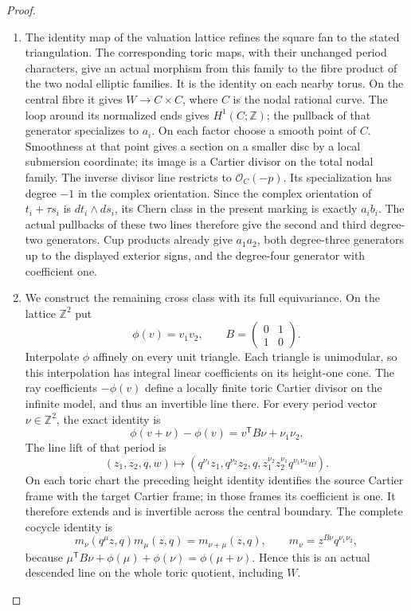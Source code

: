 \begin{proof}
\begin{enumerate}[label=\arabic*.]
\item The identity map of the valuation lattice refines the square
fan to the stated triangulation.  The corresponding toric maps,
with their unchanged period characters, give an actual morphism
from this family to the fibre product of the two nodal elliptic
families.  It is the identity on each nearby torus.  On the central
fibre it gives \(W\to C\times C\), where
\(C\) is the nodal rational curve.  The loop around its normalized
ends gives \(H^1(C;\mathbb Z)\); the pullback of that generator
specializes to \(a_i\).  On each factor choose a smooth point of
\(C\).  Smoothness at that point gives a section on a smaller
disc by a local submersion coordinate; its image is a Cartier
divisor on the total nodal family.  The inverse divisor line
restricts to \(\mathcal O_C(-p)\).  Its specialization has
degree \(-1\) in the complex orientation.  Since the complex
orientation of \(t_i+\tau s_i\) is \(dt_i\wedge ds_i\), its
Chern class in the present marking is exactly \(a_ib_i\).
The actual pullbacks of these two lines therefore give the second
and third degree-two generators.  Cup products already give
\(a_1a_2\), both degree-three generators up to the displayed
exterior signs, and the degree-four generator with coefficient one.

\item We construct the remaining cross class with its full
equivariance.  On the lattice \(\mathbb Z^2\) put
\[
       \phi(v)=v_1v_2,\qquad
       B=\begin{pmatrix}0&1\\1&0\end{pmatrix}.
\]
Interpolate \(\phi\) affinely on every unit triangle.  Each
triangle is unimodular, so this interpolation has integral
linear coefficients on its height-one cone.  The ray coefficients
\(-\phi(v)\) define a locally finite toric Cartier divisor on
the infinite model, and thus an invertible line there.  For every
period vector \(\nu\in\mathbb Z^2\), the exact identity is
\[
 \phi(v+\nu)-\phi(v)=v^{\mathsf T}B\nu+\nu_1\nu_2.
\]
The line lift of that period is
\[
 (z_1,z_2,q,w)\longmapsto
 (q^{\nu_1}z_1,q^{\nu_2}z_2,q,
      z_1^{\nu_2}z_2^{\nu_1}q^{\nu_1\nu_2}w).
\]
On each toric chart the preceding height identity identifies the
source Cartier frame with the target Cartier frame; in those
frames its coefficient is one.  It therefore extends and is
invertible across the central boundary.  The complete cocycle
identity is
\[
 m_\nu(q^\mu z,q)m_\mu(z,q)=m_{\nu+\mu}(z,q),\qquad
 m_\nu=z^{B\nu}q^{\nu_1\nu_2},
\]
because
\(\mu^{\mathsf T}B\nu+\phi(\mu)+\phi(\nu)
=\phi(\mu+\nu)\).  Hence this is an actual descended line on
the whole toric quotient, including \(W\).


\end{enumerate}
\end{proof}
